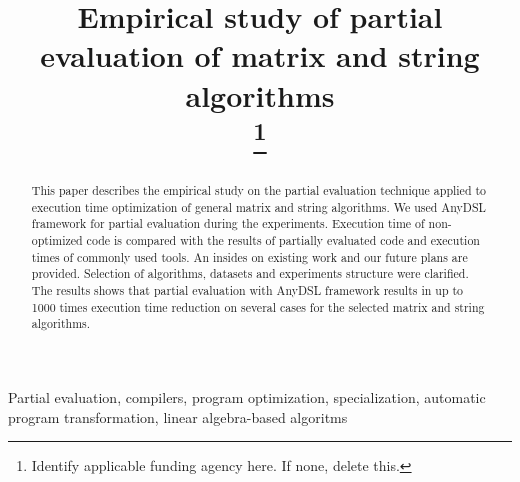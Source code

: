 \documentclass[conference]{IEEEtran}
\begin{document}
\linenumbers
\title{Empirical study of partial evaluation of matrix and string algorithms\\

\thanks{Identify applicable funding agency here. If none, delete this.}
}

\author{
\and
{}
\and
{}
}
\maketitle

\begin{abstract}
	
This paper describes the empirical study on the partial evaluation technique applied to execution time optimization of general matrix and string algorithms. We used AnyDSL framework for partial evaluation during the experiments. Execution time of non-optimized code is compared with the results of partially evaluated code and execution times of commonly used tools. An insides on existing work and our future plans are provided. Selection of algorithms, datasets and experiments structure were clarified. The results shows that partial evaluation with AnyDSL framework results in up to 1000 times execution time reduction on several cases for the selected matrix and string algorithms.
	
\end{abstract}

\begin{IEEEkeywords}
Partial evaluation, compilers, program optimization, specialization, automatic program transformation, linear algebra-based algoritms
\end{IEEEkeywords}
\end{document}
